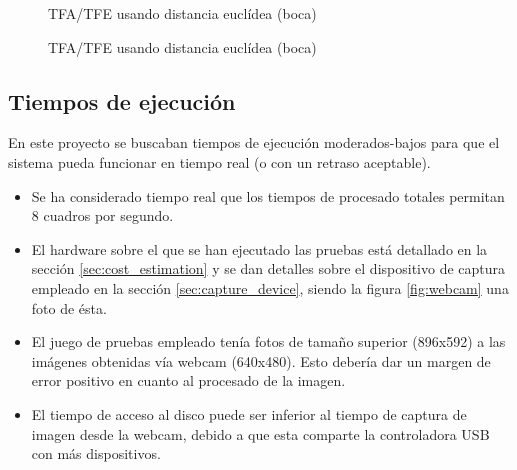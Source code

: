 \clearpage 

\begin{figure}[!ht]
	\centering
			\resizebox{7.25cm}{!}{}
			\resizebox{7.25cm}{!}{}
			\resizebox{7.25cm}{!}{}
			\resizebox{7.25cm}{!}{}
        \caption{TFA/TFE usando distancia euclídea (boca)}
        \label{fig:superp-euc-b}
\end{figure}

\begin{figure}[!ht]
	\centering
			\resizebox{7.25cm}{!}{}
			\resizebox{7.25cm}{!}{}
			\resizebox{7.25cm}{!}{}
			\resizebox{7.25cm}{!}{}
        \caption{TFA/TFE usando distancia euclídea (boca)}
        \label{fig:concat-euc-b}
\end{figure}

\clearpage

\subsection{Tiempos de ejecución}
En este proyecto se buscaban tiempos de ejecución moderados-bajos para que el sistema pueda funcionar en tiempo real (o con un retraso aceptable).
\begin{itemize}
	\item{Se ha considerado tiempo real que los tiempos de procesado totales permitan 8 cuadros por segundo.}
	\item{El hardware sobre el que se han ejecutado las pruebas está detallado en la sección \ref{sec:cost_estimation} y se dan detalles sobre el dispositivo de captura empleado en la sección \ref{sec:capture_device}, siendo la figura \ref{fig:webcam} una foto de ésta.}
	\item{El juego de pruebas empleado tenía fotos de tamaño superior (896x592) a las imágenes obtenidas vía webcam (640x480). Esto debería dar un margen de error positivo en cuanto al procesado de la imagen.}
	\item{El tiempo de acceso al disco puede ser inferior al tiempo de captura de imagen desde la webcam, debido a que esta comparte la controladora USB con más dispositivos.}
\end{itemize}

